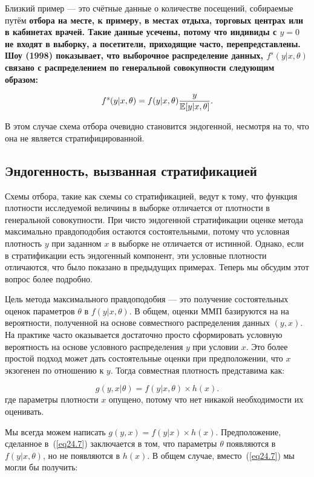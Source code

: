 Близкий пример --- это счётные данные о количестве посещений, собираемые путём \bfseries отбора на месте\mdseries, к примеру, в местах отдыха, торговых центрах или в кабинетах врачей. Такие данные усечены, потому что индивиды с $y=0$ не входят в выборку, а посетители, приходящие часто, перепредставлены. Шоу (1998) показывает, что выборочное распределение данных, $f^s(y|x,\theta)$ связано с распределением по генеральной совокупности следующим образом:

\[
f^s(y|x,\theta) = f(y|x,\theta) \frac{y}{\mathbb{E}[y|x,\theta]}.
\]

В этом случае схема отбора очевидно становится эндогенной, несмотря на то, что она не является стратифицированной. 

\subsection{Эндогенность, вызванная стратификацией}

Схемы отбора, такие как схемы со стратификацией, ведут к тому, что функция плотности исследуемой величины в выборке отличается от плотности в генеральной совокупности. При чисто эндогенной стратификации оценке метода максимально правдоподобия остаются состоятельными, потому что условная плотность $y$ при заданном $x$ в выборке не отличается от истинной. Однако, если в стратификации есть эндогенный компонент, эти условные плотности отличаются, что было показано в предыдущих примерах. Теперь мы обсудим этот вопрос более подробно. 

Цель метода максимального правдоподобия --- это получение состоятельных оценок параметров $\theta$ в $f(y|x, \theta)$. В общем, оценки ММП базируются на на вероятности, полученной на основе совместного распределения данных $(y, x)$. На практике часто оказывается достаточно просто сформировать условную вероятность на основе условного распределения $y$ при условии $x$. Это более простой подход может дать состоятельные оценки при предположении, что $x$ экзогенен по отношению к $y$. Тогда совместная плотность представима как:

\begin{equation}
\label{eq24.7}
g(y, x|\theta) = f (y| x, \theta) \times h(x). 
\end{equation}
где параметры плотности $x$ опущено, потому что нет никакой необходимости их оценивать. 

Мы всегда можем написать $g(y, x) = f (y| x) \times h(x)$. Предположение, сделанное в~(\ref{eq24.7}) заключается в том, что параметры $\theta$ появляются в $f(y | x, \theta)$, но не появляются в $h(x)$. В общем случае, вместо~(\ref{eq24.7}) мы могли бы получить:


